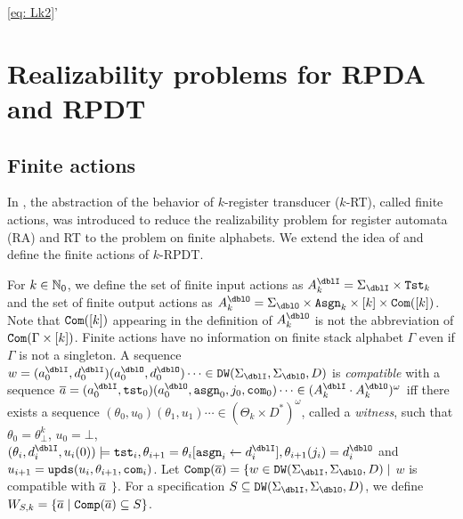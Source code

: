 \ref{eq: Lk2}'\section{Realizability problems for RPDA and RPDT}


\subsection{Finite actions}
In \cite{EFR19}, the abstraction of the behavior of $k$-register transducer ($k$-RT), called finite actions, was introduced
to reduce the realizability problem for register automata (RA) and RT to
the problem on finite alphabets.
We extend the idea of \cite{EFR19} and define the finite actions of $k$-RPDT.

For $k\in\mathbb{N}_0$,
we define the set of finite input actions as $A_k^\dblI = \Sigma_\dblI\times \Tst_k$
and the set of finite output actions as $A_k^\dblO = \Sigma_\dblO\times \Asgn_k\times [k]\times \Com([k])$.
Note that $\mathtt{Com}([k])$ appearing in the definition of $A_k^\dblO$ is not the abbreviation of $\mathtt{Com}(\Gamma\times[k])$.
Finite actions have no information on finite stack alphabet $\Gamma$ even if $\Gamma$ is not a singleton.
A sequence $w = (a^\dblI_0,d^\dblI_0) (a^\dblO_0,d^\dblO_0)\cdots \in \DW(\Sigma_\dblI,\Sigma_\dblO,D)$ is \emph{compatible} with a sequence
$\overa = (a^\dblI_0, \tst_0)(a^\dblO_0,\asgn_0,j_0, \com_0)\cdots \in (A_k^\dblI\cdot A_k^\dblO)^\omega$
iff there exists a sequence $(\theta_0,u_0)(\theta_1, u_1)\cdots\in (\Theta_k\times D^*)^\omega$, called a \emph{witness}, such that
$\theta_0 = \theta^{k}_\bot$, $u_0 = \bot$,
$(\theta_i, d^\dblI_i, u_i(0)) \models \tst_i, \theta_{i+1}=\theta_i[\asgn_i\leftarrow d^\dblI_i], \theta_{i+1}(j_i) = d^\dblO_i$ and $u_{i+1}=\mathtt{upds}(u_i,\theta_{i+1},\mathtt{com}_i)$.
Let $\Comp(\overa) = \{w\in \DW(\Sigma_\dblI,\Sigma_\dblO,D)\mid$ $w$ is compatible with ${\overline{a}}$ $\}$.
For a specification $S \subseteq \DW(\Sigma_\dblI,\Sigma_\dblO,D)$, we define $W_{S,k}=\{{\overline{a}}\mid {\mathtt{Comp}}({\overline{a}})\subseteq S\}$.

